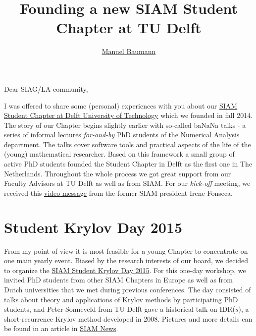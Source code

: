 \documentclass{article}
\title{\bf Founding a new SIAM Student Chapter at TU Delft}
\author{\href{http://www.manuelbaumann.de}{Manuel Baumann}}
\begin{document}
 
 \maketitle
 
 Dear SIAG/LA community,
 
 \noindent I was offered to share some (personal) experiences with you about our \href{http://sscdelft.github.io/}{SIAM Student Chapter at Delft University of Technology} which we founded in fall 2014. The story of our Chapter begins slightly earlier with so-called ba\color{red}NaN\color{black}a talks - a series of informal lectures \textit{for-and-by} PhD students of the Numerical Analysis department. The talks cover software tools and practical aspects of the life of the (young) mathematical researcher. Based on this framework a small group of active PhD students founded the Student Chapter in Delft as the first one in The Netherlands. Throughout the whole process we got great support from our Faculty Advisors at TU Delft as well as from SIAM. For our \textit{kick-off} meeting, we received this \href{https://www.youtube.com/watch?v=D9dobJG-ttw}{video message} from the former SIAM president Irene Fonseca.
 \section*{Student Krylov Day 2015}
 From my point of view it is most feasible for a young Chapter to concentrate on one main yearly event. Biased by the research interests of our board, we decided to organize the \href{http://sscdelft.github.io/activities/2015/02/02/krylov-day.html}{SIAM Student Krylov Day 2015}. For this one-day workshop, we invited PhD students from other SIAM Chapters in Europe as well as from Dutch universities that we met during previous conferences. The day consisted of talks about theory and applications of Krylov methods by participating PhD students, and Peter Sonneveld from TU Delft gave a historical talk on IDR($s$), a short-recurrence Krylov method developed in 2008. Pictures and more details can be found in an article in \href{https://sinews.siam.org/DetailsPage/tabid/607/ArticleID/504/European-Students-Gather-at-TU-Delft-for-Krylov-Day.aspx}{SIAM News}.
\end{document}
